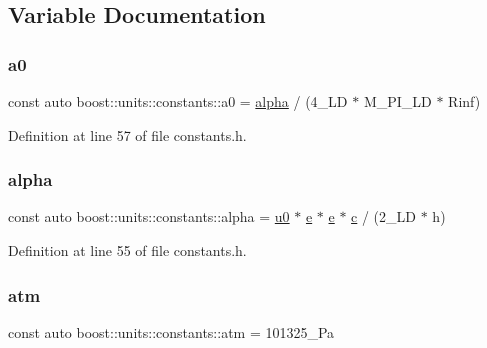 \subsection{Variable Documentation}
\hypertarget{namespaceboost_1_1units_1_1constants_a38a19270cd6907fe7d2e4560aed78947}{}\label{namespaceboost_1_1units_1_1constants_a38a19270cd6907fe7d2e4560aed78947} 
\subsubsection{\texorpdfstring{a0}{a0}}
{\footnotesize\ttfamily const auto boost\+::units\+::constants\+::a0 = \hyperlink{namespaceboost_1_1units_1_1constants_a405a220a4d6ab3135e0c6b53036eeb32}{alpha} / (4\+\_\+\+L\+D $\ast$ M\+\_\+\+P\+I\+\_\+\+L\+D $\ast$ Rinf)}



Definition at line 57 of file constants.\+h.

\hypertarget{namespaceboost_1_1units_1_1constants_a405a220a4d6ab3135e0c6b53036eeb32}{}\label{namespaceboost_1_1units_1_1constants_a405a220a4d6ab3135e0c6b53036eeb32} 
\subsubsection{\texorpdfstring{alpha}{alpha}}
{\footnotesize\ttfamily const auto boost\+::units\+::constants\+::alpha = \hyperlink{namespaceboost_1_1units_1_1constants_a18461397bf032da161b03588a4ee3db9}{u0} $\ast$ \hyperlink{namespaceboost_1_1units_1_1constants_a0e10024b337b34c7f7300c67f0e9fcb1}{e} $\ast$ \hyperlink{namespaceboost_1_1units_1_1constants_a0e10024b337b34c7f7300c67f0e9fcb1}{e} $\ast$ \hyperlink{namespaceboost_1_1units_1_1constants_a1e4c07de84b2d43e7717eaada50b32de}{c} / (2\+\_\+\+L\+D $\ast$ h)}



Definition at line 55 of file constants.\+h.

\hypertarget{namespaceboost_1_1units_1_1constants_a1239c1a33a2976f5cb8b1848dc39f92f}{}\label{namespaceboost_1_1units_1_1constants_a1239c1a33a2976f5cb8b1848dc39f92f} 
\subsubsection{\texorpdfstring{atm}{atm}}
{\footnotesize\ttfamily const auto boost\+::units\+::constants\+::atm = 101325\+\_\+\+Pa}



